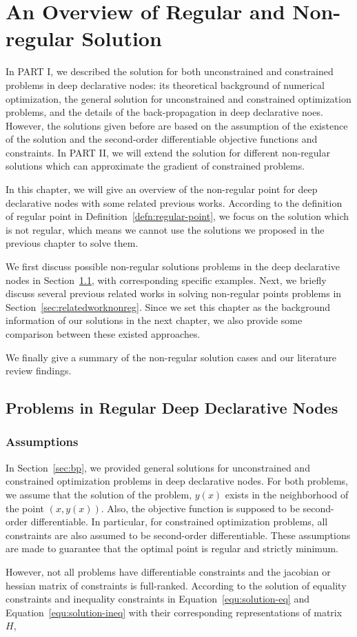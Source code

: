 \chapter{An Overview of Regular and Non-regular Solution}
\label{cha:overviewpart2}
In PART I, we described the solution for both unconstrained and constrained problems in deep declarative nodes: its theoretical background of numerical optimization, the general solution for unconstrained and constrained optimization problems, and the details of the back-propagation in deep declarative noes. However, the solutions given before are based on the assumption of the existence of the solution and the second-order differentiable objective functions and constraints. In PART II, we will extend the solution for different non-regular solutions which can approximate the gradient of constrained problems. 
\par In this chapter, we will give an overview of the non-regular point for deep declarative nodes with some related previous works. According to the definition of regular point in Definition~\ref{defn:regular-point}, we focus on the solution which is not regular, which means we cannot use the solutions we proposed in the previous chapter to solve them. 
\par We first discuss possible non-regular solutions problems in the deep declarative nodes in Section~\ref{sec:problems-in-non-regular}, with corresponding specific examples. Next, we briefly discuss several previous related works in solving non-regular points problems in Section~\ref{sec:relatedworknonreg}. Since we set this chapter as the background information of our solutions in the next chapter, we also provide some comparison between these existed approaches. 
\par We finally give a summary of the non-regular solution cases and our literature review findings. 


\section{Problems in Regular Deep Declarative Nodes}
\label{sec:problems-in-non-regular}

\subsection{Assumptions}
In Section~\ref{sec:bp}, we provided general solutions for unconstrained and constrained optimization problems in deep declarative nodes. For both problems, we assume that the solution of the problem, $y(x)$ exists in the neighborhood of the point $(x, y(x))$. Also, the objective function is supposed to be second-order differentiable. In particular, for constrained optimization problems, all constraints are also assumed to be second-order differentiable. These assumptions are made to guarantee that the optimal point is regular and strictly minimum. 
\par However, not all problems have differentiable constraints and the jacobian or hessian matrix of constraints is full-ranked. According to the solution of equality constraints and inequality constraints in Equation~\ref{equ:solution-eq} and Equation~\ref{equ:solution-ineq} with their corresponding representations of matrix $H$, 

